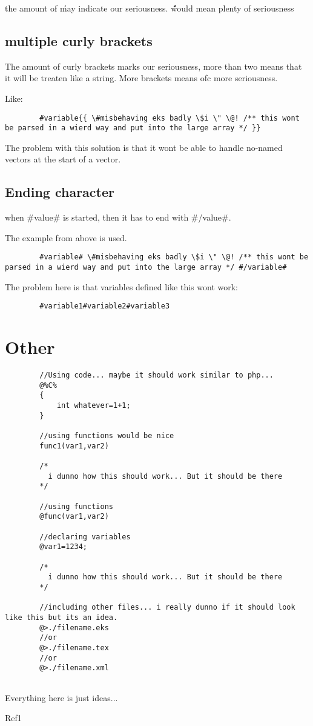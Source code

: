 \documentclass{book}
\begin{document}
		the amount of \' may indicate our seriousness. \@\'\'\'\'\'\' would mean plenty of seriousness
	
		\subsection{multiple curly brackets}
		
		The amount of curly brackets marks our seriousness, more than two means that it will be treaten like a string. More brackets means ofc more seriousness.
		
		Like:
		
		\begin{verbatim}
		#variable{{ \#misbehaving eks badly \$i \" \@! /** this wont be parsed in a wierd way and put into the large array */ }}
		\end{verbatim}
		
		The problem with this solution is that it wont be able to handle no-named vectors at the start of a vector.
		
		\subsection{Ending character}
		
		when \#value\# is started, then it has to end with \#/value\#.
		
		The example from above is used.	
		
		\begin{verbatim}
		#variable# \#misbehaving eks badly \$i \" \@! /** this wont be parsed in a wierd way and put into the large array */ #/variable#
		\end{verbatim}
		
		The problem here is that variables defined like this wont work:
		
		\begin{verbatim}
		#variable1#variable2#variable3
		\end{verbatim}
		
	\section{Other}
	
	\begin{verbatim}
		//Using code... maybe it should work similar to php...
		@%C%
		{
			int whatever=1+1;
		}
		
		//using functions would be nice
		func1(var1,var2)
		
		/*
		  i dunno how this should work... But it should be there
		*/
		
		//using functions
		@func(var1,var2)
		
		//declaring variables
		@var1=1234;
		
		/*
		  i dunno how this should work... But it should be there
		*/
		
		//including other files... i really dunno if it should look like this but its an idea.
		@>./filename.eks
		//or
		@>./filename.tex
		//or
		@>./filename.xml		
		
	\end{verbatim}
	
	Everything here is just ideas...
	
	\begin{thebibliography}{1}

		Ref1
	
	\end{thebibliography}
	
\end{document}
